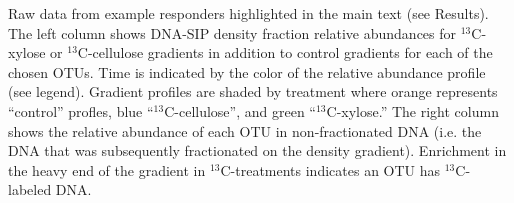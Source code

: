 Raw data from example responders highlighted in the main text (see Results).
The left column shows DNA-SIP density fraction relative abundances for
$^{13}$C-xylose or $^{13}$C-cellulose gradients in addition to control
gradients for each of the chosen OTUs. Time is indicated by the color of the
relative abundance profile (see legend). Gradient profiles are shaded by
treatment where orange represents ``control'' profles, blue
``$^{13}$C-cellulose'', and green ``$^{13}$C-xylose.'' The right column shows
the relative abundance of each OTU in non-fractionated DNA (i.e. the DNA that
was subsequently fractionated on the density gradient). Enrichment in the heavy
end of the gradient in $^{13}$C-treatments indicates an OTU has
$^{13}$C-labeled DNA.
